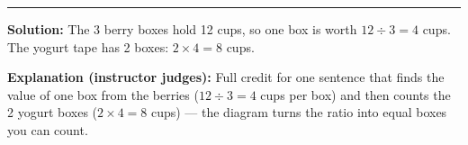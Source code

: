 \documentclass[12pt]{article}
\begin{document}
\vspace{0.3cm}\noindent\rule{\linewidth}{0.2pt}\vspace{0.3cm}


\textbf{Solution:} The 3 berry boxes hold 12 cups, so one box is worth
$12 \div 3 = 4$ cups. The yogurt tape has 2 boxes: $2 \times 4 = 8$ cups.

\textbf{Explanation (instructor judges):} Full credit for one sentence that
finds the value of one box from the berries ($12 \div 3 = 4$ cups per box) and
then counts the 2 yogurt boxes ($2 \times 4 = 8$ cups) — the diagram turns the
ratio into equal boxes you can count.
\end{document}
